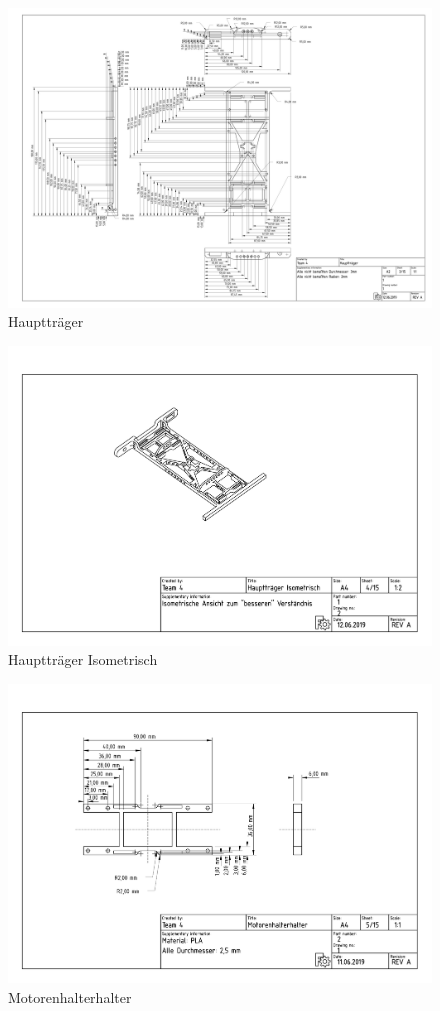 \begin{figure}[ht!]
	\includegraphics[width=\textwidth]{../techzeich/1.PDF} 	
	\caption{Hauptträger}
\end{figure}

\begin{figure}[ht!]
	\includegraphics[width=\textwidth]{../techzeich/1iso.PDF} 	
	\caption{Hauptträger Isometrisch}
\end{figure}

\begin{figure}[ht!]
	\includegraphics[width=\textwidth]{../techzeich/2.PDF} 	
	\caption{Motorenhalterhalter}
\end{figure}

